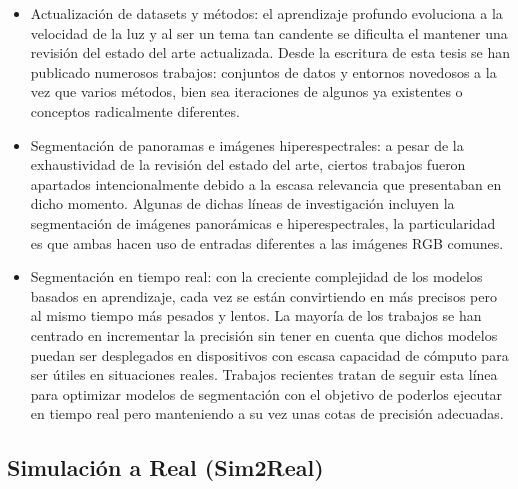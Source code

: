 \begin{itemize}
    \item Actualización de datasets y métodos: el aprendizaje profundo evoluciona a la velocidad de la luz y al ser un tema tan candente se dificulta el mantener una revisión del estado del arte actualizada. Desde la escritura de esta tesis se han publicado numerosos trabajos: conjuntos de datos y entornos novedosos a la vez que varios métodos, bien sea iteraciones de algunos ya existentes o conceptos radicalmente diferentes.
    \item Segmentación de panoramas e imágenes hiperespectrales: a pesar de la exhaustividad de la revisión del estado del arte, ciertos trabajos fueron apartados intencionalmente debido a la escasa relevancia que presentaban en dicho momento. Algunas de dichas líneas de investigación incluyen la segmentación de imágenes panorámicas e hiperespectrales, la particularidad es que ambas hacen uso de entradas diferentes a las imágenes RGB comunes.
    \item Segmentación en tiempo real: con la creciente complejidad de los modelos basados en aprendizaje, cada vez se están convirtiendo en más precisos pero al mismo tiempo más pesados y lentos. La mayoría de los trabajos se han centrado en incrementar la precisión sin tener en cuenta que dichos modelos puedan ser desplegados en dispositivos con escasa capacidad de cómputo para ser útiles en situaciones reales. Trabajos recientes tratan de seguir esta línea para optimizar modelos de segmentación con el objetivo de poderlos ejecutar en tiempo real pero manteniendo a su vez unas cotas de precisión adecuadas.
\end{itemize}

\subsection{Simulación a Real (Sim2Real)}

